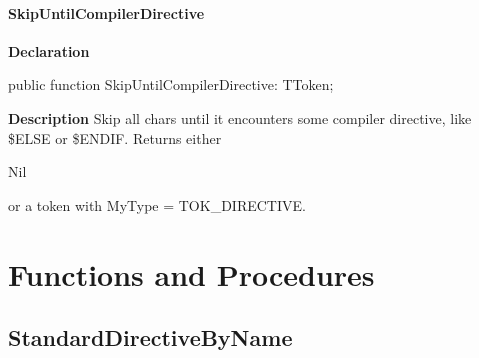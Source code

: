 \documentclass{report}
\newif\ifpdf
\begin{document}
\paragraph*{SkipUntilCompilerDirective}\hspace*{\fill}

\label{PasDoc_Tokenizer.TTokenizer-SkipUntilCompilerDirective}
\begin{list}{}{
\setlength{\itemindent}{0cm}
\setlength{\listparindent}{0cm}
\setlength{\leftmargin}{\evensidemargin}
\addtolength{\leftmargin}{\tmplength}
\settowidth{\labelsep}{X}
\addtolength{\leftmargin}{\labelsep}
\setlength{\labelwidth}{\tmplength}
}
\item[\textbf{Declaration}\hfill]
\ifpdf
\begin{flushleft}
\fi
\begin{ttfamily}
public function SkipUntilCompilerDirective: TToken;\end{ttfamily}

\ifpdf
\end{flushleft}
\fi

\par
\item[\textbf{Description}]
Skip all chars until it encounters some compiler directive, like {\$}ELSE or {\$}ENDIF. Returns either \begin{ttfamily}Nil\end{ttfamily} or a token with MyType = TOK{\_}DIRECTIVE.

\end{list}
\section{Functions and Procedures}
\ifpdf
\subsection*{\large{\textbf{StandardDirectiveByName}}\normalsize\hspace{1ex}\hrulefill}
\else
\end{document}
